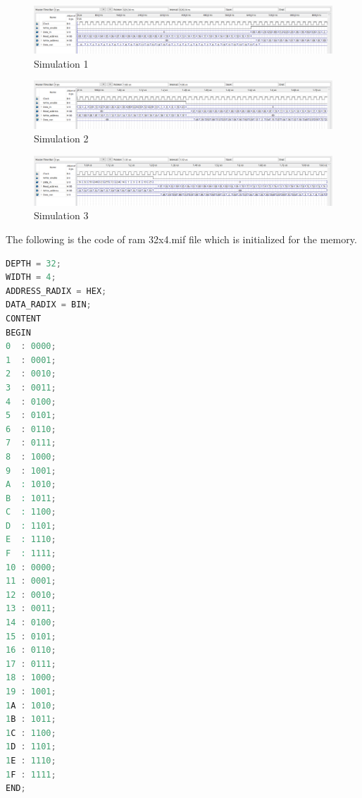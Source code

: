 \begin{figure}[h]
    \centering
    \includegraphics[scale = 0.4]{source/picture/Lab8/simulation_1.png}
    \caption{Simulation 1}
\end{figure}
\newpage
\begin{figure}[h]
    \centering
    \includegraphics[scale = 0.4]{source/picture/Lab8/simulation_2.png}
    \caption{Simulation 2}
\end{figure}
\begin{figure}[h]
    \centering
    \includegraphics[scale = 0.4]{source/picture/Lab8/simulation_3.png}
    \caption{Simulation 3}
\end{figure}
The following is the code of ram 32x4.mif file which is initialized for the memory.
\begin{lstlisting}[language=Verilog]
DEPTH = 32;
WIDTH = 4;
ADDRESS_RADIX = HEX;
DATA_RADIX = BIN;
CONTENT
BEGIN
0  : 0000;
1  : 0001;
2  : 0010;
3  : 0011;
4  : 0100;
5  : 0101;
6  : 0110;
7  : 0111;
8  : 1000;
9  : 1001;
A  : 1010;
B  : 1011;
C  : 1100;
D  : 1101;
E  : 1110;
F  : 1111;
10 : 0000;
11 : 0001;
12 : 0010;
13 : 0011;
14 : 0100;
15 : 0101;
16 : 0110;
17 : 0111;
18 : 1000;
19 : 1001;
1A : 1010;
1B : 1011;
1C : 1100;
1D : 1101;
1E : 1110;
1F : 1111;
END;

\end{lstlisting}
